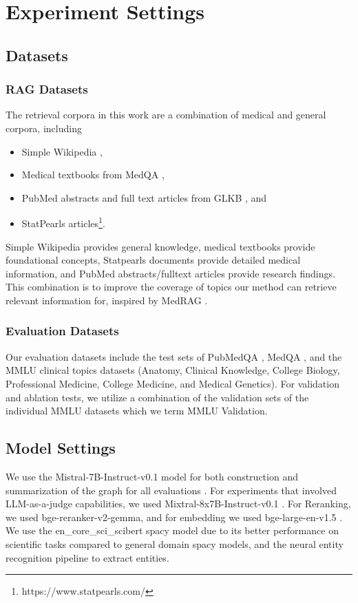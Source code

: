 \documentclass[11pt]{article}
\theoremstyle{definition}
\begin{document}
\section{Experiment Settings}

\subsection{Datasets}
\subsubsection{RAG Datasets}
\label{sec:RAGDatasets}
The retrieval corpora in this work are a combination of medical and general corpora, including 
\begin{itemize}[noitemsep,leftmargin=*]
    \item Simple Wikipedia \cite{wikidump}, 
    \item Medical textbooks from MedQA \cite{jin2020disease}, 
    \item PubMed abstracts and full text articles from GLKB \cite{huang2024building}, and 
    \item StatPearls articles\footnote{https://www.statpearls.com/}. 
\end{itemize}  

Simple Wikipedia provides general knowledge, medical textbooks provide foundational concepts, Statpearls documents provide detailed medical information, and PubMed abstracts/fulltext articles provide research findings. This combination is to improve the coverage of topics our method can retrieve relevant information for, inspired by MedRAG \cite{DBLP:conf/acl/Xiong0LZ24}. 
\subsubsection{Evaluation Datasets}
\label{sec:EvalDatasets}
Our evaluation datasets include the test sets of PubMedQA \cite{jin2019pubmedqa}, MedQA \cite{jin2020disease}, and the MMLU clinical topics datasets \cite{DBLP:conf/iclr/HendrycksBBZMSS21} (Anatomy, Clinical Knowledge, College Biology, Professional Medicine, College Medicine, and Medical Genetics). For validation and ablation tests, we utilize a combination of the validation sets of the individual MMLU datasets which we term MMLU Validation.
\subsection{Model Settings}
We use the Mistral-7B-Instruct-v0.1 model for both construction and summarization of the graph for all evaluations \cite{DBLP:journals/corr/abs-2310-06825}. For experiments that involved LLM-as-a-judge capabilities, we used Mixtral-8x7B-Instruct-v0.1 \cite{DBLP:journals/corr/abs-2401-04088}. For Reranking, we used bge-reranker-v2-gemma, and for embedding we used bge-large-en-v1.5 \cite{li2023making}. We use the en\_core\_sci\_scibert spacy model \cite{neumann-etal-2019-scispacy} due to its better performance on scientific tasks compared to general domain spacy models, and the neural entity recognition pipeline to extract entities.
\end{document}
